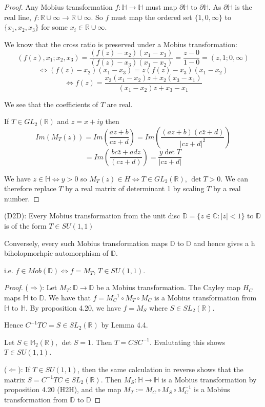 \begin{proof}
	Any Mobius transformation $f: \mathbb{H} \rightarrow \mathbb{H}$ must map $\partial \mathbb{H}$ to $\partial \mathbb{H}$. As $\partial \mathbb{H}$ is the real line, $f: \mathbb{R} \cup \infty \rightarrow \mathbb{R} \cup \infty$. So $f$ must map the ordered set $\{1, 0, \infty \}$ to $\{x_1, x_2, x_3\}$ for some $x_i \in \mathbb{R} \cup \infty$.

	We know that the cross ratio is preserved under a Mobius transformation:
	\[(f(z), x_1; x_2, x_3) = \frac{(f(z) - x_2)(x_1 - x_3)}{(f(z) - x_3)(x_1 - x_2)} = \frac{z - 0}{1 - 0} = (z, 1; 0, \infty)\]
	\[\Leftrightarrow (f(z) - x_2)(x_1 - x_3) = z (f(z) - x_3)(x_1 - x_2)\]
	\[\Leftrightarrow f(z) = \frac{x_3 (x_1 - x_2) z + x_2 (x_3 - x_1)}{(x_1 - x_2)z + x_3 - x_1}\]

	We see that the coefficients of $T$ are real.
	
	If $T \in GL_2 (\mathbb{R})$ and $z = x + iy$ then
	\[Im(M_T(z)) = Im(\frac{az + b}{cz + d}) = Im(\frac{(az + b)(c \bar{z} + d)}{|cz + d|^2})\]
	\[= Im(\frac{bc \bar{z} + adz}{(cz + d)}) = \frac{y \det T}{|cz+d|}\]

	We have $z \in \mathbb{H} \Leftrightarrow y > 0$ so $M_T(z) \in H \Leftrightarrow T \in GL_2(\mathbb{R})$, $\det T > 0$. We can therefore replace $T$ by a real matrix of determinant 1 by scaling $T$ by a real number.
\end{proof}

\begin{proposition}
	(D2D): Every Mobius transformation from the unit disc $\mathbb{D} = \{z \in \mathbb{C}: |z| < 1\}$ to $\mathbb{D}$ is of the form $T \in SU(1, 1)$

	Conversely, every such Mobius transformation maps $\mathbb{D}$ to $\mathbb{D}$ and hence gives a h
	biholopmorhpic automorphism of $\mathbb{D}$.

	i.e. $f \in Mob(\mathbb{D}) \Leftrightarrow f = M_T$, $T \in SU(1, 1)$.
\end{proposition}

\begin{proof}
	($\Rightarrow$): Let $M_T: \mathbb{D} \rightarrow \mathbb{D}$ be a Mobius transformation. The Cayley map $H_C$ maps $\mathbb{H}$ to $\mathbb{D}$. We have that $f = M_C^{-1} \circ M_T \circ M_C$ is a Mobius transformation from $\mathbb{H}$ to $\mathbb{H}$. By proposition 4.20, we have $f = M_S$ where $S \in SL_2(\mathbb{R})$.

	Hence $C^{-1} T C = S \in SL_2(\mathbb{R})$ by Lemma 4.4.

	Let $S \in \mathbb{M}_2(\mathbb{R})$, $\det S = 1$. Then $T = CSC^{-1}$. Evalutating this shows $T \in SU(1, 1)$.

	($\Leftarrow$): If $T \in SU(1, 1)$, then the same calculation in reverse shows that the matrix $S = C^{-1} T C \in SL_2(\mathbb{R})$. Then $M_S: \mathbb{H} \rightarrow \mathbb{H}$ is a Mobius transformation by proposition 4.20 (H2H), and the map $M_T := M_C \circ M_S \circ M_C^{-1}$ is a Mobius transformation from $\mathbb{D}$ to $\mathbb{D}$
\end{proof}

